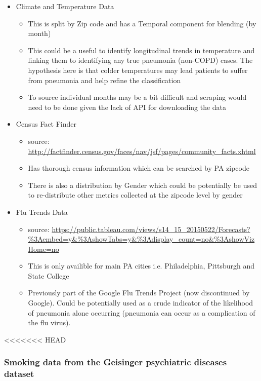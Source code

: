 \documentclass{article}
\begin{document}
\begin{itemize}
  \item Climate and Temperature Data
  \begin{itemize}
    \item This is split by Zip code and has a Temporal component for blending (by month)
    \item This could be a useful to identify longitudinal trends in temperature
          and linking them to identifying any true pneumonia (non-COPD) cases. The 
          hypothesis here is that colder temperatures may lead patients to 
          suffer from pneumonia and help refine the classification
    \item To source individual months may be a bit difficult and scraping 
          would need to be done given the lack of API for downloading the data
  \end{itemize}
  \item Census Fact Finder
  \begin{itemize}
    \item source: \url{http://factfinder.census.gov/faces/nav/jsf/pages/community_facts.xhtml}
    \item Has thorough census information which can be searched by PA zipcode
    \item There is also a distribution by Gender which could be potentially be 
          used to re-distribute other metrics collected at the zipcode level by 
          gender
  \end{itemize}
  \item Flu Trends Data
  \begin{itemize}
    \item source: \url{https://public.tableau.com/views/s14_15_20150522/Forecasts?%3Aembed=y&%3AshowTabs=y&%3Adisplay_count=no&%3AshowVizHome=no}
    \item This is only availible for main PA cities i.e. Philadelphia, 
          Pittsburgh and State College
    \item Previously part of the Google Flu Trends Project (now discontinued by 
          Google). Could be potentially used as a crude indicator of the 
          likelihood of pneumonia alone occurring (pneumonia can occur as 
          a complication of the flu virus).
  \end{itemize}
\end{itemize}

<<<<<<< HEAD
\subsubsection{Smoking data from the Geisinger psychiatric diseases dataset}
\end{document}
